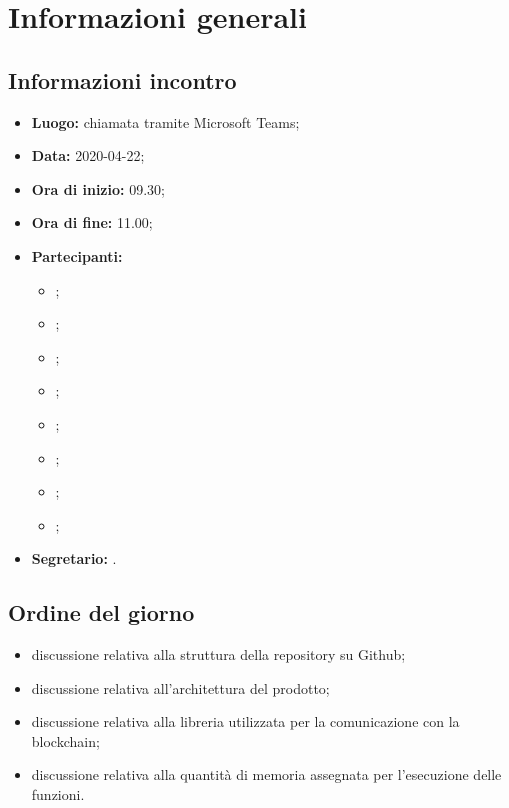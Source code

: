 \section{Informazioni generali}
\subsection{Informazioni incontro}
\begin{itemize}
	\item \textbf{Luogo:} chiamata tramite Microsoft Teams; 
	\item \textbf{Data:} 2020-04-22;
	\item \textbf{Ora di inizio:} 09.30; 
	\item \textbf{Ora di fine:} 11.00; 
	\item \textbf{Partecipanti:}
		\begin{itemize}
			\item \VB; 
			\item \LB; 
			\item \NF; 
			\item \EG; 
			\item \FJ; 
			\item \MP; 
			\item \AS; 
			\item \AZ; 
		\end{itemize}
	\item \textbf{Segretario:} \AZ. 
\end{itemize}

\subsection{Ordine del giorno}
\begin{itemize}
	\item discussione relativa alla struttura della repository su Github; 
	\item discussione relativa all'architettura del prodotto;
	\item discussione relativa alla libreria utilizzata per la comunicazione con la blockchain;
	\item discussione relativa alla quantità di memoria assegnata per l'esecuzione delle funzioni.
\end{itemize}
